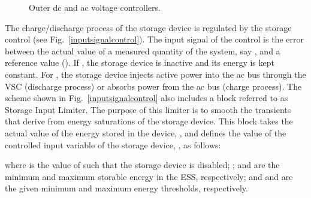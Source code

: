 \documentclass[journal, a4paper]{IEEEtran}
\begin{document}
\begin{figure}[h!]
  \begin{center}
    \psfrag{+}{\tiny{}}    
    \psfrag{-}{\tiny{}}
    \psfrag{+}{\tiny{}}    
    \psfrag{-}{\tiny{}}
    \caption{Outer dc and ac voltage controllers.}
    \label{vscoutercontrol}
  \end{center}
\vspace{-0.4cm}
\end{figure}

The charge/discharge process of the storage device is regu\-lated by
the storage control (see Fig.~\ref{inputsignalcontrol}).  The input
signal of the control is the error between the actual value of a
measured quantity of the system, say , and a reference
value (). If , the storage device is inactive and its energy is kept
constant.  For , the storage
device injects active power into the ac bus through the VSC (discharge
process) or absorbs power from the ac bus (charge process). 
The scheme shown in Fig.~\ref{inputsignalcontrol} also includes a block
  referred to as Storage Input Limiter\cite{ortega:15}. The
  purpose of this limiter is to smooth the transients that derive from
  energy saturations of the storage device. 
  This block takes the actual
  value of the energy stored in the device, , and defines the value
  of the controlled input variable of the storage device, , as
  follows:

where  is the value of  such that the storage device
is disabled; ;  and
 are the minimum and maximum storable energy in the ESS,
respectively; and  and 
are the given minimum and maximum energy thresholds, respectively. 
\end{document}

